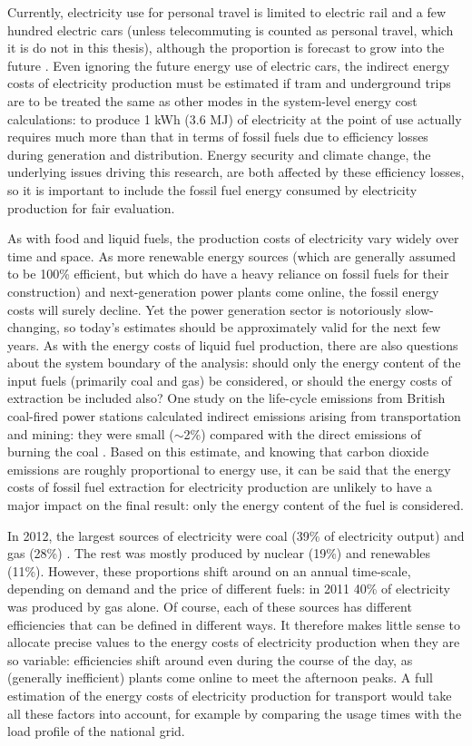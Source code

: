 Currently, electricity use for personal travel is limited to electric
rail and a few hundred electric cars (unless telecommuting is counted as
personal travel, which it is do not in this thesis),
although the proportion is forecast to grow into the future \citep{Skea2010}.
Even ignoring the future energy use of electric cars, the indirect energy costs
of electricity production must be estimated if 
tram and underground trips are to be treated the same as other modes in the
system-level energy cost calculations: to produce 1 kWh (3.6 MJ) of electricity
at the point of use actually requires much more than that in terms of fossil
fuels due to efficiency losses during generation and distribution. Energy
security and climate change, the underlying issues driving this research, are
both affected by these efficiency losses, so it is important to include the
fossil fuel energy consumed by electricity production for fair evaluation.

As with food and liquid fuels, the production costs of electricity vary widely
over time and space. As more renewable energy sources (which are generally
assumed to be 100\% efficient, but which do have a heavy reliance on fossil
fuels for their construction) and next-generation power plants come online,
the fossil energy costs will surely decline. Yet the power generation sector is
notoriously slow-changing, so today's estimates should be approximately valid
for the next few years. As with the energy costs of liquid fuel production,
there are also questions about the system boundary of the analysis: should only
the energy content of the input fuels (primarily coal and gas) be considered,
or should the energy costs of extraction be included also? One study on the
life-cycle emissions from British coal-fired power stations calculated indirect
emissions arising from transportation and mining: they were small ($\sim$2\%)
compared with the direct emissions of burning the coal \citep{Odeh2008212}.
Based on this estimate, and knowing that carbon dioxide emissions are roughly
proportional to energy use, it can be said that the energy costs of fossil fuel
extraction for electricity production are unlikely to have a major impact on
the final result: only the energy content of the fuel is considered.

In 2012, the largest sources of electricity were coal (39\% of electricity
output) and gas (28\%) \citep{Decc2013-elec}. The rest was mostly produced by
nuclear (19\%) and renewables (11\%). However, these proportions shift around
on an annual time-scale, depending on demand and the price of different fuels:
in 2011 40\% of electricity was produced by gas alone. Of course, each of
these sources has different efficiencies that can be defined in different ways.
It therefore makes little sense to allocate precise values to the energy costs
of electricity production when they are so variable: efficiencies shift around
even during the course of the day, as (generally inefficient) plants come
online to meet the afternoon peaks. A full estimation of the energy costs of
electricity production for transport would take all these factors into account,
for example by comparing the usage times with the load profile of the national
grid.

